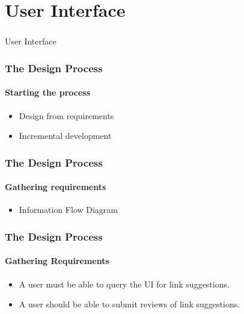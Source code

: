 \section[UI]{User Interface}

\begin{frame}
  \frametitle{}
  \begin{center}
    {\Huge User Interface}
  \end{center}
\end{frame}

\begin{frame}
    \frametitle{The Design Process}
    \framesubtitle{Starting the process}
    \begin{itemize}
    	\item Design from requirements
    	\item Incremental development
    \end{itemize}
\end{frame}

\begin{frame}
    \frametitle{The Design Process}
    \framesubtitle{Gathering requirements}
    \begin{itemize}
    	\item Information Flow Diagram
    \end{itemize}
\end{frame}

{

}

\begin{frame}
    \frametitle{The Design Process}
    \framesubtitle{Gathering Requirements}
    \begin{itemize}
    	\item A user must be able to query the UI for link suggestions.
    	\item A user should be able to submit reviews of link suggestions.
    \end{itemize}
\end{frame}

